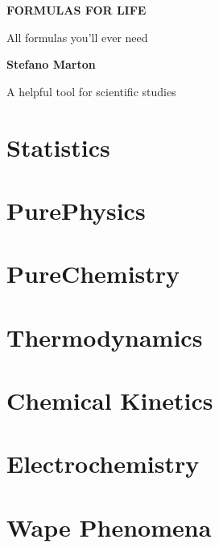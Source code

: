 \documentclass[a4,11pt]{report}
\makeatletter
\renewcommand\tableofcontents{%
		 \begin{multicols}{2}[\section*{\contentsname
				     \@mkboth{%
						      \MakeUppercase\contentsname}{\MakeUppercase\contentsname}}]%
				   \@starttoc{toc}%
		 \end{multicols}%
}
\makeatother
\begin{document}
 \begin{titlepage}
		  \begin{center}
				   \vspace*{6cm}

				   \Huge
				   \textbf{FORMULAS FOR LIFE}

				   \vspace{0.5cm}
				   \LARGE
				   All formulas you'll ever need

				   \vspace{1.5cm}

				   \textbf{Stefano Marton}

				   \vfill

				   A helpful tool for scientific studies

				   \vspace{0.8cm}

		  \end{center}
 \end{titlepage}

 \tableofcontents

 \chapter{Statistics}
  

 \chapter{PurePhysics}
  

 \chapter{PureChemistry}
  

 \chapter{Thermodynamics}
  

 \chapter{Chemical Kinetics}
  

 \chapter{Electrochemistry}
  

 \chapter{Wape Phenomena}
  

 
\end{document}
